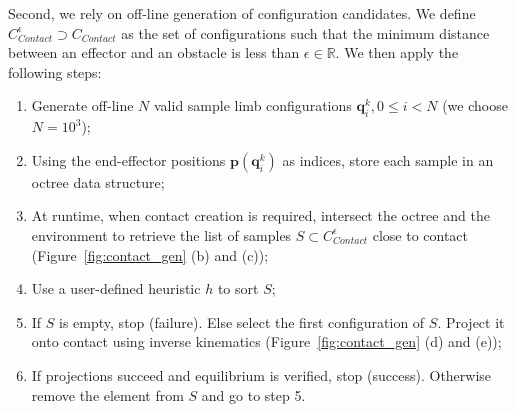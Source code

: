 %
Second, we rely on off-line generation of configuration candidates.
We define $C_{Contact}^{\epsilon} \supset C_{Contact}$ as the set of configurations such that the minimum distance 
between an effector and an obstacle is less than $\epsilon \in \mathbb{R}$.
We then apply the following steps:
\begin{enumerate}
\item Generate off-line $N$ valid sample limb configurations $\mathbf{q}^k_i,  0 \leq i < N$ (we choose $N=10^3$);
\item Using the end-effector positions $\mathbf{p}(\mathbf{q}^k_i)$ as indices, store each sample in an octree data structure;
\item At runtime, when contact creation is required, intersect the octree and the environment to retrieve the list of samples $S \subset C_{Contact}^{\epsilon}$ close to contact (Figure~\ref{fig:contact_gen} (b) and (c));
\item Use a user-defined heuristic $h$ to sort $S$;
\item If $S$ is empty, stop (failure). Else select the first configuration of $S$. Project it onto contact using inverse kinematics (Figure~\ref{fig:contact_gen} (d) and (e));
\item If projections succeed and equilibrium is verified, stop (success). Otherwise remove the element from $S$ and go to step 5.
\end{enumerate}

